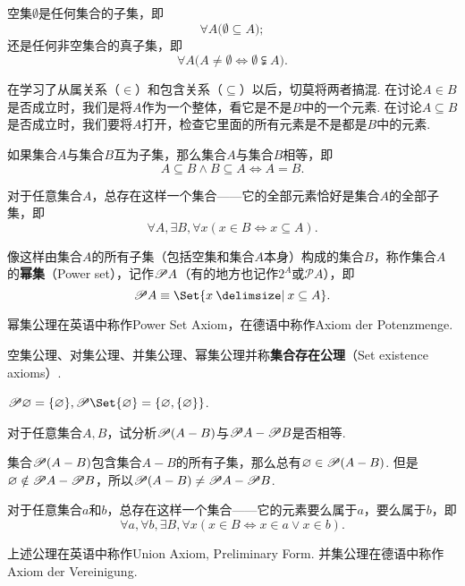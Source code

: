 \begin{property}
空集\(\emptyset\)是任何集合的子集，即\[
\forall A \bigl( \emptyset \subseteq A \bigr);
\]还是任何非空集合的真子集，即\[
\forall A \bigl( A \neq \emptyset \iff \emptyset \subsetneqq A \bigr).
\]
\end{property}

在学习了从属关系（\(\in\)）和包含关系（\(\subseteq\)）以后，切莫将两者搞混.
在讨论\(A \in B\)是否成立时，我们是将\(A\)作为一个整体，看它是不是\(B\)中的一个元素.
在讨论\(A \subseteq B\)是否成立时，我们要将\(A\)打开，检查它里面的所有元素是不是都是\(B\)中的元素.

\begin{theorem}
如果集合\(A\)与集合\(B\)互为子集，那么集合\(A\)与集合\(B\)相等，即\[
A \subseteq B \land B \subseteq A \iff A = B.
\]
\end{theorem}

\begin{axiom}[幂集公理]
对于任意集合\(A\)，总存在这样一个集合——它的全部元素恰好是集合\(A\)的全部子集，即\[
\forall A, \exists B, \forall x ( x \in B \iff x \subseteq A ).
\]

像这样由集合\(A\)的所有子集（包括空集和集合\(A\)本身）构成的集合\(B\)，称作集合\(A\)的\textbf{幂集}（Power set），记作\(\mathscr{P} A\)（有的地方也记作\(2^A\)或\(\mathcal{P}A\)），即\[
\Powerset A \equiv \Set{x \given x \subseteq A}.
\]
\end{axiom}
幂集公理在英语中称作Power Set Axiom，在德语中称作Axiom der Potenzmenge.

空集公理、对集公理、并集公理、幂集公理并称\textbf{集合存在公理}（Set existence axioms）.

\begin{example}
\(\Powerset \emptyset = \{ \emptyset \},%
\Powerset \Set{ \emptyset } = \{ \emptyset, \{ \emptyset \} \}\).
\end{example}

\begin{example}
对于任意集合\(A,B\)，试分析\(\mathscr{P}(A-B)\)与\(\mathscr{P} A - \mathscr{P} B\)是否相等.
\begin{solution}
集合\(\mathscr{P}(A-B)\)包含集合\(A-B\)的所有子集，那么总有\(\varnothing\in\mathscr{P}(A-B)\).
但是\(\varnothing\notin\mathscr{P} A - \mathscr{P} B\)，所以\(\mathscr{P}(A-B) \neq \mathscr{P} A - \mathscr{P} B\).
\end{solution}
\end{example}

\begin{axiom}[并集公理]
对于任意集合\(a\)和\(b\)，总存在这样一个集合——它的元素要么属于\(a\)，要么属于\(b\)，即\[
\forall a, \forall b, \exists B, \forall x( x \in B \iff x \in a \lor x \in b ).
\]
\end{axiom}
上述公理在英语中称作Union Axiom, Preliminary Form.
并集公理在德语中称作Axiom der Vereinigung.


